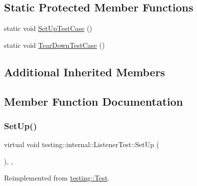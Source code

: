 \subsection*{Static Protected Member Functions}
\begin{DoxyCompactItemize}
\item 
static void \hyperlink{classtesting_1_1internal_1_1_listener_test_a7cbc298576e584b4021d0375204b7391}{Set\+Up\+Test\+Case} ()
\item 
static void \hyperlink{classtesting_1_1internal_1_1_listener_test_aa35b5f1c6235f0fe98aa2c7f35bb8fe1}{Tear\+Down\+Test\+Case} ()
\end{DoxyCompactItemize}
\subsection*{Additional Inherited Members}


\subsection{Member Function Documentation}
\mbox{\label{classtesting_1_1internal_1_1_listener_test_ace3dbe36b705ddf320518e6cdd919bc8}} 
\subsubsection{\texorpdfstring{Set\+Up()}{SetUp()}}
{\footnotesize\ttfamily virtual void testing\+::internal\+::\+Listener\+Test\+::\+Set\+Up (\begin{DoxyParamCaption}{ }\end{DoxyParamCaption})\hspace{0.3cm}{\ttfamily [inline]}, {\ttfamily [protected]}, {\ttfamily [virtual]}}



Reimplemented from \hyperlink{classtesting_1_1_test_a190315150c303ddf801313fd1a777733}{testing\+::\+Test}.

\mbox{\label{classtesting_1_1internal_1_1_listener_test_a7cbc298576e584b4021d0375204b7391}} 
